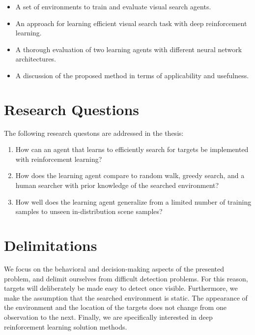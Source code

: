 \begin{itemize}
  \item A set of environments to train and evaluate visual search agents.
  \item An approach for learning efficient visual search task with deep reinforcement learning.
  \item A thorough evaluation of two learning agents with different neural network architectures.
  \item A discussion of the proposed method in terms of applicability and usefulness.
\end{itemize}

\section{Research Questions}
\label{sec:questions}

The following research questons are addressed in the thesis:

\begin{enumerate}
  \item \label{itm:rq1} How can an agent that learns to efficiently search for targets be implemented with reinforcement learning?
  \item \label{itm:rq2} How does the learning agent compare to random walk, greedy search, and a human searcher with prior knowledge of the searched environment?
  \item \label{itm:rq3} How well does the learning agent generalize from a limited number of training samples to unseen in-distribution scene samples?
\end{enumerate}

\section{Delimitations}
\label{sec:delimitations}

We focus on the behavioral and decision-making aspects of the presented problem, and delimit ourselves from difficult detection problems.
For this reason, targets will deliberately be made easy to detect once visible.
Furthermore, we make the assumption that the searched environment is static.
The appearance of the environment and the location of the targets does not change from one observation to the next.
Finally, we are specifically interested in deep reinforcement learning solution methods.
